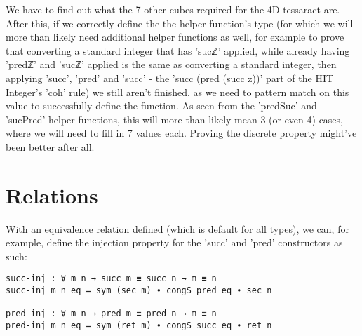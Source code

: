 We have to find out what the 7 other cubes required for the 4D tessaract are. After this, if we correctly define the the helper function's type (for which we will more than likely need additional helper functions as well, for example to prove that converting a standard integer that has 'sucℤ' applied, while already having 'predℤ' and 'sucℤ' applied is the same as converting a standard integer, then applying 'succ', 'pred' and 'succ' - the 'succ (pred (succ z))' part of the HIT Integer's 'coh' rule) we still aren't finished, as we need to pattern match on this value to successfully define the function. As seen from the 'predSuc' and 'sucPred' helper functions, this will more than likely mean 3 (or even 4) cases, where we will need to fill in 7 values each.
Proving the discrete property might've been better after all.

\section{Relations}
With an equivalence relation defined (which is default for all types), we can, for example, define the injection property for the 'succ' and 'pred' constructors as such:
\begin{verbatim}
succ-inj : ∀ m n → succ m ≡ succ n → m ≡ n
succ-inj m n eq = sym (sec m) ∙ congS pred eq ∙ sec n

pred-inj : ∀ m n → pred m ≡ pred n → m ≡ n
pred-inj m n eq = sym (ret m) ∙ congS succ eq ∙ ret n
\end{verbatim}

